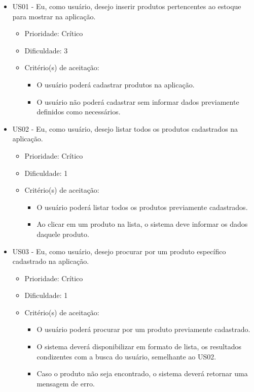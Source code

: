 \begin{itemize}
\item US01 - Eu, como usuário, desejo inserir produtos pertencentes ao estoque para mostrar na aplicação.
    \begin{itemize}
    \item Prioridade: Crítico
    \item Dificuldade: 3
    \item Critério(s) de aceitação:
			\begin{itemize}
				\item O usuário poderá cadastrar produtos na aplicação.
				\item O usuário não poderá cadastrar sem informar dados previamente definidos como necessários.
    	\end{itemize}
		\end{itemize}

\item US02 - Eu, como usuário, desejo listar todos os produtos cadastrados na aplicação.
    \begin{itemize}
    \item Prioridade: Crítico
    \item Dificuldade: 1
    \item Critério(s) de aceitação:
		  \begin{itemize}
			  \item O usuário poderá listar todos os produtos previamente cadastrados.
				\item Ao clicar em um produto na lista, o sistema deve informar os dados daquele produto.
			\end{itemize}
		\end{itemize}

\item US03 - Eu, como usuário, desejo procurar por um produto específico cadastrado na aplicação.
    \begin{itemize}
    \item Prioridade: Crítico
    \item Dificuldade: 1
    \item Critério(s) de aceitação:
		  \begin{itemize}
			  \item O usuário poderá procurar por um produto previamente cadastrado.
				\item O sistema deverá disponibilizar em formato de lista, os resultados condizentes com a busca do usuário, semelhante ao US02.
				\item Caso o produto não seja encontrado, o sistema deverá retornar uma mensagem de erro.
			\end{itemize}
		\end{itemize}


\end{itemize}
